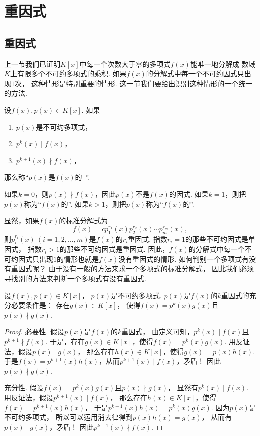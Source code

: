 \section{重因式}
\subsection{重因式}
上一节我们已证明\(K[x]\)中每一个次数大于零的多项式\(f(x)\)能唯一地分解成
数域\(K\)上有限多个不可约多项式的乘积.
如果\(f(x)\)的分解式中每一个不可约因式只出现\(1\)次，
这种情形是特别重要的情形.
这一节我们要给出识别这种情形的一个统一的方法.

\begin{definition}
设\(f(x),p(x) \in K[x]\).
如果\begin{enumerate}
	\item \(p(x)\)是不可约多项式，
	\item \(p^k(x) \mid f(x)\)，
	\item \(p^{k+1}(x) \nmid f(x)\)，
\end{enumerate}
那么称“\(p(x)\)是\(f(x)\)的~”.

如果\(k=0\)，则\(p(x) \nmid f(x)\)，因此\(p(x)\)不是\(f(x)\)的因式.
如果\(k=1\)，则把\(p(x)\)称为“\(f(x)\)的”.
如果\(k>1\)，则把\(p(x)\)称为“\(f(x)\)的”.
\end{definition}

显然，如果\(f(x)\)的标准分解式为\begin{equation*}
	f(x) = c p_1^{r_1}(x) p_2^{r_2}(x) \dotsm p_m^{r_m}(x),
\end{equation*}
则\(p_i^{r_i}(x)\ (i=1,2,\dotsc,m)\)是\(f(x)\)的\(r_i\)重因式.
指数\(r_i = 1\)的那些不可约因式是单因式，
指数\(r_i > 1\)的那些不可约因式是重因式.
因此，\(f(x)\)的分解式中每一个不可约因式只出现\(1\)的情形也就是\(f(x)\)没有重因式的情形.
如何判别一个多项式有没有重因式呢？
由于没有一般的方法来求一个多项式的标准分解式，
因此我们必须寻找别的方法来判断一个多项式有没有重因式.

\begin{proposition}\label{theorem:多项式.重因式的等价定义}
设\(f(x),p(x) \in K[x]\)，
\(p(x)\)是不可约多项式.
\(p(x)\)是\(f(x)\)的\(k\)重因式的充分必要条件是：
存在\(g(x) \in K[x]\)，
使得\(f(x) = p^k(x) g(x)\)且\(p(x) \nmid g(x)\).
\begin{proof}
必要性.
假设\(p(x)\)是\(f(x)\)的\(k\)重因式，
由定义可知，\(p^k(x) \mid f(x)\)且\(p^{k+1} \nmid f(x)\).
于是，存在\(g(x) \in K[x]\)，使得\(f(x) = p^k(x) g(x)\).
用反证法，假设\(p(x) \mid g(x)\)，
那么存在\(h(x) \in K[x]\)，使得\(g(x) = p(x) h(x)\).
于是\(f(x) = p^{k+1}(x) h(x)\)，从而\(p^{k+1}(x) \mid f(x)\)，矛盾！
因此\(p(x) \nmid g(x)\).

充分性.
假设\(f(x) = p^k(x) g(x)\)且\(p(x) \nmid g(x)\)，
显然有\(p^k(x) \mid f(x)\).
用反证法，假设\(p^{k+1}(x) \mid f(x)\)，
那么存在\(h(x) \in K[x]\)，使得\(f(x) = p^{k+1}(x) h(x)\)，
于是\(p^{k+1}(x) h(x) = p^k(x) g(x)\).
因为\(p(x)\)是不可约多项式，
所以可以运用消去律得到\(p(x) h(x) = g(x)\)，
从而有\(p(x) \mid g(x)\)，矛盾！
因此\(p^{k+1}(x) \nmid f(x)\).
\end{proof}
\end{proposition}

